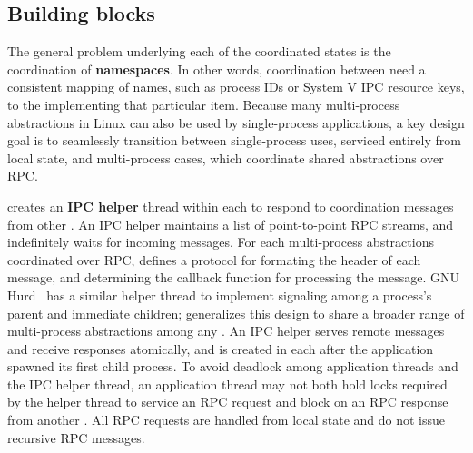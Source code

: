 \subsection{Building blocks}
\label{sec:libos:namespaces:building-blocks}

The general problem underlying each of the coordinated \libos{} states is 
the coordination of {\bf namespaces}.  In other words, coordination between \picoprocs{} need 
a consistent mapping of names, such as process IDs or System V IPC resource keys, 
to the \picoproc{} implementing that particular item.  
Because many multi-process abstractions in Linux can also be used by single-process applications,
a key design goal is to seamlessly transition between single-process uses, serviced 
entirely from local \libos{} state, and multi-process cases, which coordinate shared abstractions over RPC.


\thelibos{} creates an {\bf IPC helper} thread within each \picoproc{}
to respond to coordination messages from other \picoprocs{}. 
An IPC helper
maintains a list of point-to-point RPC streams, and indefinitely waits for incoming messages.
For each multi-process abstractions coordinated over RPC,
\thelibos{} defines a protocol for formating the header of each message,
and determining the callback function for processing the message.
GNU Hurd~\cite{hurd} has a similar helper thread to implement signaling among a process's parent and
immediate children;
\graphene{} generalizes this design to share a broader range of multi-process abstractions among any \picoprocs{}.
An IPC helper serves remote messages and receive responses atomically,
and is created in each \picoproc{}
after the application spawned its first child process.
To avoid deadlock among application threads and the IPC helper thread, 
an application thread may not both hold locks required by the helper thread to service an RPC request
and block on an RPC response from another \picoproc{}.
All RPC requests are handled from local state and do not issue recursive RPC messages.%

